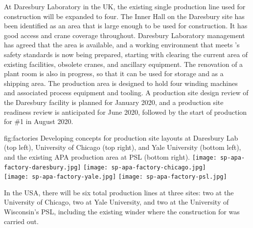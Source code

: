 At Daresbury Laboratory in the UK, the existing single production line used for  construction will be expanded to four.  The Inner Hall on the Daresbury site has been identified as an area that is large enough to be used for   construction. It has good access and crane coverage throughout. Daresbury Laboratory management has agreed that the area is available, and a working environment that meets 's safety standards is now being prepared, starting with clearing the current area of existing facilities, obsolete cranes, and ancillary equipment. The renovation of a plant room is also in progress, so that it can be used for storage and as a shipping area. The production area is designed to hold four winding machines and associated process equipment and tooling.  A production site design review of the Daresbury facility is planned for January 2020, and a production site readiness review is anticipated for June 2020, followed by the start of  production for   \#1 in August 2020.  


\begin{dunefigure}{fig:factories}
{Developing concepts for production site layouts at Daresbury Lab (top left), University of Chicago (top right), and Yale University (bottom left), and the existing APA production area at PSL (bottom right).}
\texttt{[image: sp-apa-factory-daresbury.jpg]} 
\texttt{[image: sp-apa-factory-chicago.jpg]} \\
\vspace{1mm}
\texttt{[image: sp-apa-factory-yale.jpg]}
\texttt{[image: sp-apa-factory-psl.jpg]} 
\end{dunefigure}

In the USA, there will be six total production lines at three sites: two at the University of Chicago, two at Yale University, and two at the University of Wisconsin's PSL, including the existing winder where the construction for  was carried out. 

